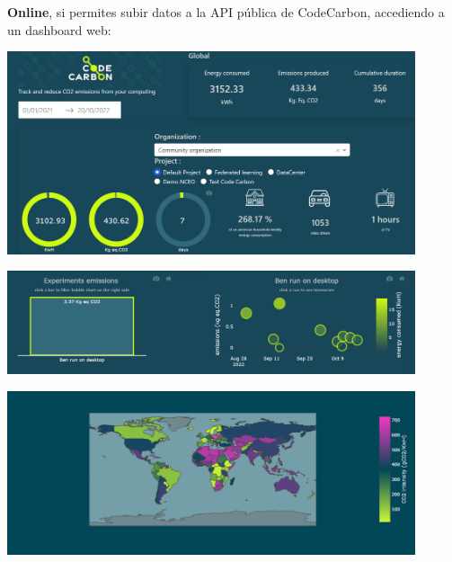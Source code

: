 \documentclass[12pt,a4paper]{report}
\begin{document}
\textbf{Online}, si permites subir datos a la API pública de CodeCarbon, accediendo a un dashboard web:

\begin{center}
    \includegraphics[width=0.9\textwidth]{imagenes/CC_3.png}
\end{center}

\begin{center}
    \includegraphics[width=0.9\textwidth]{imagenes/CC_4.png}
\end{center}

\begin{center}
    \includegraphics[width=0.9\textwidth]{imagenes/CC_5.png}
\end{center}
\end{document}
